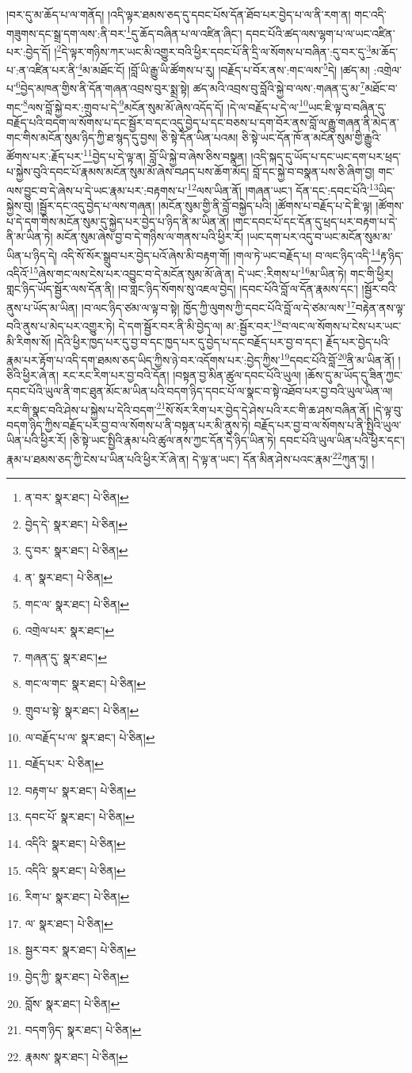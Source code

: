 །བར་དུ་མ་ཆོད་པ་ལ་གནོད། །འདི་ལྟར་ཐམས་ཅད་དུ་དབང་པོས་དོན་ཐོབ་པར་བྱེད་པ་ལ་ནི་རག་ན། གང་འདི་གཟུགས་དང་སྒྲ་དག་ལས་:ནི་བར་\footnote{ན་བར་  སྣར་ཐང་།  པེ་ཅིན། }དུ་ཆོད་བཞིན་པ་ལ་འཛིན་ཞིང་། དབང་པོའི་ཚད་ལས་ལྷག་པ་ལ་ཡང་འཛིན་པར་:བྱེད་དོ། །\footnote{བྱེད་དེ་  སྣར་ཐང་།  པེ་ཅིན། }དེ་ལྟར་གཉིས་ཀར་ཡང་མི་འགྱུར་བའི་ཕྱིར་དབང་པོ་ནི་དྲི་ལ་སོགས་པ་བཞིན་:དུ་བར་དུ་\footnote{དུ་བར་  སྣར་ཐང་།  པེ་ཅིན། }མ་ཆོད་པ་:ན་འཛིན་པར་ནི་\footnote{ན་  སྣར་ཐང་།  པེ་ཅིན། }མ་མཐོང་ངོ། །བློ་ཡི་རྒྱུ་ཡི་ཚོགས་པ་རུ། །བརྗོད་པ་བོར་ནས་:གང་ལས་\footnote{གང་ལ་  སྣར་ཐང་།  པེ་ཅིན། }དེ། །ཚད་མ། :འགྲེལ་པ་\footnote{འགྲེལ་པར་  སྣར་ཐང་། }བྱེད་མཁན་གྱིས་ནི་དོན་གཞན་འབྲས་བུར་སྨྲ་སྟེ། ཚད་མའི་འབྲས་བུ་བློའི་སྐྱེ་བ་ལས་:གཞན་དུ་མ་\footnote{གཞན་དུ་  སྣར་ཐང་། }མཐོང་བ་གང་\footnote{གང་ལ་གང་  སྣར་ཐང་།  པེ་ཅིན། }ལས་བློ་སྐྱེ་བར་:གྲུབ་པ་དེ་\footnote{གྲུབ་པ་སྟེ་  སྣར་ཐང་།  པེ་ཅིན། }མངོན་སུམ་མོ་ཞེས་འདོད་དོ། །དེ་ལ་བརྗོད་པ་དེ་ལ་\footnote{ལ་བརྗོད་པ་ལ་  སྣར་ཐང་།  པེ་ཅིན། }ཡང་ཇི་ལྟ་བ་བཞིན་དུ་བརྗོད་པའི་བདག་ལ་སོགས་པ་དང་སྦྱོར་བ་དང་འདུ་བྱེད་པ་དང་བཅས་པ་དག་བོར་ནས་བློ་ལ་རྒྱུ་གཞན་ནི་མེད་ན་གང་གིས་མངོན་སུམ་ཉིད་ཀྱི་ཐ་སྙད་དུ་བྱས། ཅི་སྟེ་དོན་ཡིན་པའམ། ཅི་སྟེ་ཡང་དོན་ཁོ་ན་མངོན་སུམ་གྱི་རྒྱུའི་ཚོགས་པར་:རྗོད་པར་\footnote{བརྗོད་པར་  པེ་ཅིན། }བྱེད་པ་དེ་ལྟ་ན། བློ་ཡི་སྐྱེ་བ་ཞེས་ཅིས་བསྣན། །འདི་སྐད་དུ་ཡོད་པ་དང་ཡང་དག་པར་ཕྲད་པ་སྐྱེས་བུའི་དབང་པོ་རྣམས་མངོན་སུམ་མོ་ཞེས་བཤད་པས་ཆོག་མོད། བློ་དང་སྐྱེ་བ་བསྣན་པས་ཅི་ཞིག་བྱ། གང་ལས་བྱུང་བ་དེ་ཞེས་པ་དེ་ཡང་རྣམ་པར་:བརྟགས་པ་\footnote{བརྟག་པ་  སྣར་ཐང་།  པེ་ཅིན། }ལས་ཡིན་ནོ། །གཞན་ཡང་། དོན་དང་:དབང་པོའི་\footnote{དབང་པོ་  སྣར་ཐང་།  པེ་ཅིན། }ཡིད་སྐྱེས་བུ། །སྦྱོར་དང་འདུ་བྱེད་པ་ལས་གཞན། །མངོན་སུམ་གྱི་ནི་བློ་བསྐྱེད་པའི། །ཚོགས་པ་བརྗོད་པ་དེ་ཇི་ལྟ། །ཚོགས་པ་དེ་དག་གིས་མངོན་སུམ་དུ་སྐྱེད་པར་བྱེད་པ་ཉིད་ནི་མ་ཡིན་ནོ། །གང་དབང་པོ་དང་དོན་དུ་ཕྲད་པར་བརྟག་པ་དེ་ནི་མ་ཡིན་ཏེ། མངོན་སུམ་ཞེས་བྱ་བ་དེ་གཉིས་ལ་གནས་པའི་ཕྱིར་རོ། །ཡང་དག་པར་འདུ་བ་ཡང་མངོན་སུམ་མ་ཡིན་པ་ཉིད་དེ། འདི་སོ་སོར་སྒྲུབ་པར་བྱེད་པའོ་ཞེས་མི་བརྟག་གོ། །གལ་ཏེ་ཡང་བརྗོད་པ། བ་ལང་ཉིད་འདི་\footnote{འདིའི་  སྣར་ཐང་།  པེ་ཅིན། }རྟ་ཉིད་འདིའོ་\footnote{འདིའི་  སྣར་ཐང་།  པེ་ཅིན། }ཞེས་གང་ལས་ངེས་པར་འབྱུང་བ་དེ་མངོན་སུམ་མོ་ཞེ་ན། དེ་ཡང་:རིགས་པ་\footnote{རིག་པ་  སྣར་ཐང་།  པེ་ཅིན། }མ་ཡིན་ཏེ། གང་གི་ཕྱིར། གླང་ཉིད་ཡོད་སྦྱོར་ལས་དོན་ནི། །བ་གླང་ཉིད་སོགས་སུ་འཇལ་བྱེད། །དབང་པོའི་བློ་ལ་དོན་རྣམས་དང་། །སྦྱོར་བའི་ནུས་པ་ཡོད་མ་ཡིན། །བ་ལང་ཉིད་ཙམ་ལ་ལྟ་བ་སྟེ། ཁྱོད་ཀྱི་ལུགས་ཀྱི་དབང་པོའི་བློ་ལ་དེ་ཙམ་ལས་\footnote{ལ་  སྣར་ཐང་།  པེ་ཅིན། }བརྟེན་ནས་ལྟ་བའི་ནུས་པ་མེད་པར་འགྱུར་ཏེ། དེ་དག་སྦྱོར་བར་ནི་མི་བྱེད་ལ། མ་:སྦྱོར་བར་\footnote{སྦྱར་བར་  སྣར་ཐང་།  པེ་ཅིན། }བ་ལང་ལ་སོགས་པ་ངེས་པར་ཡང་མི་རིགས་སོ། །དེའི་ཕྱིར་ཁྱད་པར་དུ་བྱ་བ་དང་ཁྱད་པར་དུ་བྱེད་པ་དང་བརྗོད་པར་བྱ་བ་དང་། རྗོད་པར་བྱེད་པའི་རྣམ་པར་རྟོག་པ་འདི་དག་ཐམས་ཅད་ཡིད་ཀྱིས་ཉེ་བར་འདོགས་པར་:བྱེད་ཀྱིས་\footnote{བྱེད་ཀྱི་  སྣར་ཐང་།  པེ་ཅིན། }དབང་པོའི་བློ་\footnote{བློས་  སྣར་ཐང་།  པེ་ཅིན། }ནི་མ་ཡིན་ནོ། །ཅིའི་ཕྱིར་ཞེ་ན། རང་རང་རིག་པར་བྱ་བའི་དོན། །བསྟན་བྱ་མིན་ཚུལ་དབང་པོའི་ཡུལ། །ཆོས་དུ་མ་ཡོད་དུ་ཟིན་ཀྱང་དབང་པོའི་ཡུལ་ནི་གང་ཐུན་མོང་མ་ཡིན་པའི་བདག་ཉིད་དབང་པོ་ལ་སྣང་བ་སྟེ་འཐོབ་པར་བྱ་བའི་ཡུལ་ཡིན་ལ། རང་གི་སྣང་བའི་ཤེས་པ་སྐྱེས་པ་དེའི་བདག་\footnote{བདག་ཉིད་  སྣར་ཐང་།  པེ་ཅིན། }སོ་སོར་རིག་པར་བྱེད་དེ་ཤེས་པའི་རང་གི་ཆ་ཤས་བཞིན་ནོ། །དེ་ལྟ་བུ་བདག་ཉིད་ཀྱིས་བརྗོད་པར་བྱ་བ་ལ་སོགས་པ་ནི་བསྟན་པར་མི་ནུས་ཏེ། བརྗོད་པར་བྱ་བ་ལ་སོགས་པ་ནི་སྤྱིའི་ཡུལ་ཡིན་པའི་ཕྱིར་རོ། །ཅི་སྟེ་ཡང་སྤྱིའི་རྣམ་པའི་ཚུལ་ནས་ཀྱང་དོན་དེ་ཉིད་ཡིན་ཏེ། དབང་པོའི་ཡུལ་ཡིན་པའི་ཕྱིར་དང་། རྣམ་པ་ཐམས་ཅད་ཀྱི་ངེས་པ་ཡིན་པའི་ཕྱིར་རོ་ཞེ་ན། དེ་ལྟ་ན་ཡང་། དོན་མིན་ཤེས་པའང་རྣམ་\footnote{རྣམས་  སྣར་ཐང་།  པེ་ཅིན། }ཀུན་ཏུ། །
